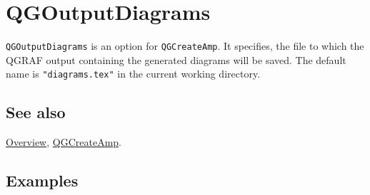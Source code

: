 \documentclass[../FeynHelpersManual.tex]{subfiles}
\begin{document}
\hypertarget{qgoutputdiagrams}{
\section{QGOutputDiagrams}\label{qgoutputdiagrams}}

\texttt{QGOutputDiagrams} is an option for \texttt{QGCreateAmp}. It
specifies, the file to which the QGRAF output containing the generated
diagrams will be saved. The default name is \texttt{"diagrams.tex"} in
the current working directory.

\subsection{See also}

\hyperlink{toc}{Overview}, \hyperlink{qgcreateamp}{QGCreateAmp}.

\subsection{Examples}
\end{document}
